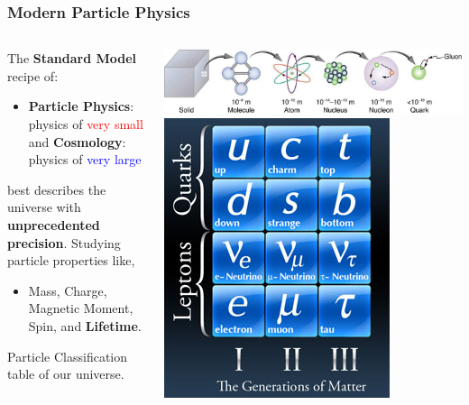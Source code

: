 \documentclass{beamer}
\begin{document}
\begin{frame}
\frametitle{Modern Particle Physics}
 \begin{minipage}[t]{0.9\paperwidth}
 \begin{columns}
   \begin{column}{0.70\linewidth}
    The \textcolor{UMN@Maroon}{\textbf{Standard Model}} recipe of:
      \begin{itemize}
       \item \textbf{Particle Physics}: physics of \textcolor{red}{very small} and  \textbf{Cosmology}: physics of \textcolor{blue}{very large}
      \end{itemize}
     best describes the universe with \textcolor{UMN@Maroon}{\textbf{unprecedented precision}}.
     Studying particle properties like,
     \begin{itemize}
       \item Mass, Charge, Magnetic Moment, Spin, and \textcolor{UMN@Maroon}{\textbf{Lifetime}}.
     \end{itemize}   
     Particle Classification table of our universe.  
    \end{column}
   \begin{column}{0.45\linewidth}
    \mbox{\includegraphics[height=0.35\textwidth, width=0.55\linewidth]{THESISPLOTS/New-Physics-PLOTS/Matter-Content-Particle-Physics.jpg}}
    \mbox{\includegraphics[height=0.35\textwidth, width=0.55\linewidth]{THESISPLOTS/New-Physics-PLOTS/ParticleInSM-chart.jpg}}

\end{column}
\end{columns}
\end{minipage}
\end{frame}
\end{document}
